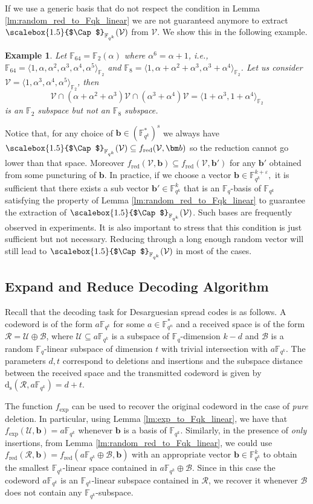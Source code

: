 \documentclass{article}
\newtheorem{example}{Example}
\newcommand{\F}{\mathbb{F}}
\newcommand{\Fq}{\mathbb{F}_{q}}
\newcommand{\Fqn}{\mathbb{F}_{q^n}}
\newcommand{\Fqk}{\mathbb{F}_{q^k}}
\newcommand{\ds}{\mathrm{d_s}}
\newcommand{\calB}{\mathcal{B}}
\newcommand{\calR}{\mathcal{R}}
\newcommand{\calU}{\mathcal{U}}
\newcommand{\calV}{\mathcal{V}}
\newcommand{\fred}{f_{\mathrm{red}}}
\newcommand{\fexp}{f_{\mathrm{exp}}}
\newcommand{\Core}[1]{\mathop{\scalebox{1.5}{$\Cap$}}\nolimits_{\mathbb{F}_{q^k}}(#1)}
\begin{document}
If we use a generic basis that do not respect the condition in Lemma \ref{lm:random_red_to_Fqk_linear} we are not guaranteed anymore to extract $\Core{\calV}$ from $\calV$.
We show this in the following example.
\begin{example}
    Let $\F_{64}=\F_{2}(\alpha)$ where $\alpha^6=\alpha+1$, i.e., $\mathbb{F}_{64}=\langle 1,\alpha,\alpha^2,\alpha^3,\alpha^4,\alpha^5\rangle_{\F_2}$ and $\F_8=\langle 1, \alpha+\alpha^2+\alpha^3,\alpha^3+\alpha^4\rangle_{\F_2}$. Let us consider $\calV=\langle 1,\alpha^3,\alpha^4,\alpha^5\rangle_{\F_2}$, then 
    \[
    \calV\cap(\alpha+\alpha^2+\alpha^3) \calV\cap(\alpha^3+\alpha^4) \calV= \langle 1+\alpha^3,1+\alpha^4\rangle_{\F_2}
    \]
    is an $\F_2$ subspace but not an $\F_8$ subspace.
\end{example}
Notice that, for any choice of $\bm b \in (\Fqk^*)^s$ we always have $\Core{\calV}\subseteq \fred(\calV, \bm b)$ so the reduction cannot go lower than that space. Moreover $\fred(\calV, \bm b) \subseteq \fred(\calV, \bm b')$ for any $\bm b'$ obtained from some puncturing of $\bm b$.
In practice, if we choose a vector $\bm b \in \Fqk^{k + \varepsilon},$ it is sufficient that there exists a sub vector $\bm b'\in \Fqk^{k}$ that is an $\Fq$-basis of $\Fqk$ satisfying the property of Lemma \ref{lm:random_red_to_Fqk_linear} to guarantee the extraction of $\Core{\calV}$.
Such bases are frequently observed in experiments. It is also important to stress that this condition is just sufficient but not necessary. Reducing through a long enough random vector will still lead to $\Core{\calV}$ in most of the cases.


\subsection{Expand and Reduce Decoding Algorithm}
\label{sec:A first decoding algorithm}
Recall that the decoding task for Desarguesian spread codes is as follows.
A codeword is of the form $a \Fqk$ for some $a \in \Fqn^*$ and 
a received space is of the form $\calR = \calU \oplus \calB$, where $\calU \subseteq a \Fqk$ is a subspace of $\Fq$-dimension $k-d$ and $\calB$ is a random $\Fq$-linear subspace of dimension $t$ with trivial intersection with $a \Fqk$. The parameters $d,t$ correspond to deletions and insertions and the subspace distance between the received space and the transmitted codeword is given by $\ds(\calR,a \Fqk) = d+t$.

\smallskip

The function $\fexp$ can be used to recover the original codeword in the case of \textit{pure} deletion. In particular, using Lemma \ref{lm:exp_to_Fqk_linear}, we have that $\fexp(\calU, \bm b) = a \Fqk$ whenever $\bm b$ is a basis of $\Fqk.$ Similarly, in the presence of \textit{only} insertions, from Lemma \ref{lm:random_red_to_Fqk_linear}, we could use $\fred(\calR,\bm b)= \fred(a \Fqk \oplus \calB, \bm b)$ with an appropriate vector $\bm b\in\Fqk^k$ to obtain the smallest $\Fqk$-linear space contained in $a \Fqk \oplus \calB$. Since in this case the codeword $a\Fqk$ is an $\Fqk$-linear subspace contained in $\calR$, we recover it whenever $\calB$ does not contain any $\Fqk$-subspace.
\end{document}
